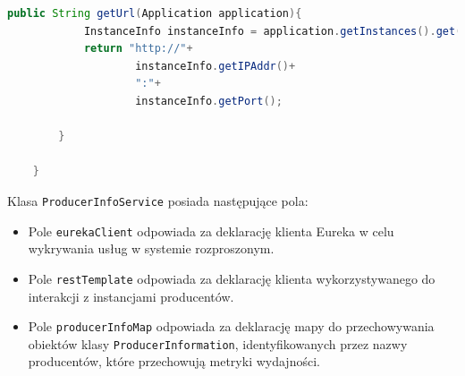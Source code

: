 \begin{lstlisting}[language=Java, caption=Kod usługi ProducerInfoService,label=ProducerInfoServiceCode]
        public String getUrl(Application application){
            InstanceInfo instanceInfo = application.getInstances().get(0);
            return "http://"+
                    instanceInfo.getIPAddr()+
                    ":"+
                    instanceInfo.getPort();
    
        }
    
    }

\end{lstlisting}

Klasa \verb|ProducerInfoService| posiada następujące pola:
\begin{itemize}
    \item Pole \verb|eurekaClient| odpowiada za deklarację klienta Eureka w celu wykrywania usług w systemie rozproszonym.
    \item Pole \verb|restTemplate| odpowiada za deklarację klienta  wykorzystywanego do interakcji z instancjami producentów.
    \item Pole \verb|producerInfoMap| odpowiada za deklarację mapy do przechowywania obiektów klasy \verb|ProducerInformation|, identyfikowanych przez nazwy producentów, które przechowują metryki wydajności.
\end{itemize}

